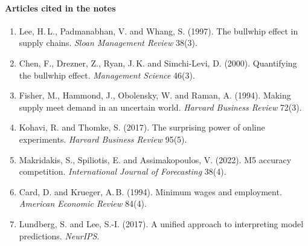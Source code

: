 \paragraph{Articles cited in the notes}
\begin{enumerate}[nosep]
\item Lee, H.\,L., Padmanabhan, V. and Whang, S. (1997). The bullwhip effect in supply chains. \emph{Sloan Management Review} 38(3).
\item Chen, F., Drezner, Z., Ryan, J.\,K. and Simchi-Levi, D. (2000). Quantifying the bullwhip effect. \emph{Management Science} 46(3).
\item Fisher, M., Hammond, J., Obolensky, W. and Raman, A. (1994). Making supply meet demand in an uncertain world. \emph{Harvard Business Review} 72(3).
\item Kohavi, R. and Thomke, S. (2017). The surprising power of online experiments. \emph{Harvard Business Review} 95(5).
\item Makridakis, S., Spiliotis, E. and Assimakopoulos, V. (2022). M5 accuracy competition. \emph{International Journal of Forecasting} 38(4).
\item Card, D. and Krueger, A.\,B. (1994). Minimum wages and employment. \emph{American Economic Review} 84(4).
\item Lundberg, S. and Lee, S.-I. (2017). A unified approach to interpreting model predictions. \emph{NeurIPS}.
\end{enumerate}


